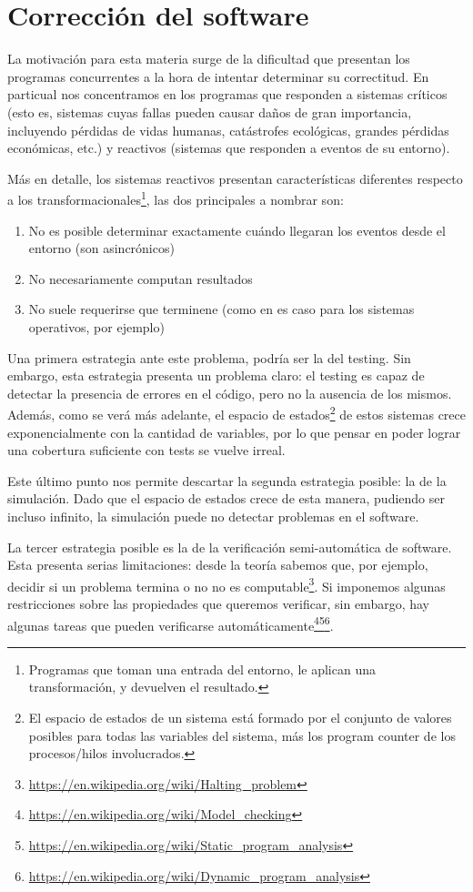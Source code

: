 \section{Corrección del software}
La motivación para esta materia surge de la dificultad que presentan los programas concurrentes a la hora de intentar determinar su correctitud. En particual nos concentramos en los programas que responden a sistemas críticos (esto es, sistemas cuyas fallas pueden causar daños de gran importancia, incluyendo pérdidas de vidas humanas, catástrofes ecológicas, grandes pérdidas económicas, etc.) y reactivos (sistemas que responden a eventos de su entorno).

Más en detalle, los sistemas reactivos presentan características diferentes respecto a los transformacionales\footnote{Programas que toman una entrada del entorno, le aplican una transformación, y devuelven el resultado.}, las dos principales a nombrar son:
\begin{enumerate}
  \item No es posible determinar exactamente cuándo llegaran los eventos desde el entorno (son asincrónicos)
  \item No necesariamente computan resultados
  \item No suele requerirse que terminene (como en es caso para los sistemas operativos, por ejemplo)
\end{enumerate}

Una primera estrategia ante este problema, podría ser la del testing. Sin embargo, esta estrategia presenta un problema claro: el testing es capaz de detectar la presencia de errores en el código, pero no la ausencia de los mismos. Además, como se verá más adelante, el espacio de estados\footnote{El espacio de estados de un sistema está formado por el conjunto de valores posibles para todas las variables del sistema, más los program counter de los procesos/hilos involucrados.} de estos sistemas crece exponencialmente con la cantidad de variables, por lo que pensar en poder lograr una cobertura suficiente con tests se vuelve irreal.

Este último punto nos permite descartar la segunda estrategia posible: la de la simulación. Dado que el espacio de estados crece de esta manera, pudiendo ser incluso infinito, la simulación puede no detectar problemas en el software.

La tercer estrategia posible es la de la verificación semi-automática de software. Esta presenta serias limitaciones: desde la teoría sabemos que, por ejemplo, decidir si un problema termina o no no es computable\footnote{\url{https://en.wikipedia.org/wiki/Halting_problem}}. Si imponemos algunas restricciones sobre las propiedades que queremos verificar, sin embargo, hay algunas tareas que pueden verificarse automáticamente\footnote{\url{https://en.wikipedia.org/wiki/Model_checking}}\footnote{\url{https://en.wikipedia.org/wiki/Static_program_analysis}}\footnote{\url{https://en.wikipedia.org/wiki/Dynamic_program_analysis}}.


